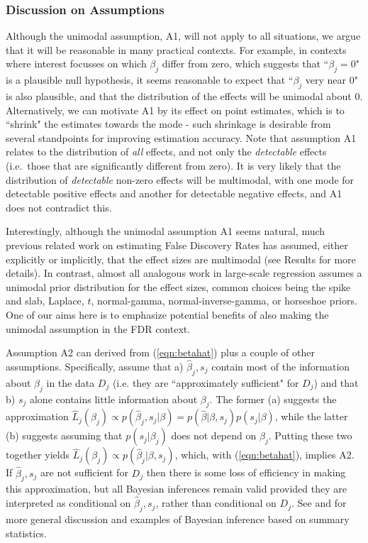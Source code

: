 \documentclass[11pt]{article}
\begin{document}
 \subsubsection*{Discussion on Assumptions}
 
Although the unimodal assumption, A1, will not apply to all situations, we argue that it will be reasonable in many practical contexts. 
For example, in contexts where interest focusses on which $\beta_j$ differ from zero, which suggests that ``$\beta_j=0$" is a plausible null hypothesis,  
it seems reasonable to expect that ``$\beta_j$ very near 0" is also plausible, and that the distribution of the effects will be unimodal about 0. 
Alternatively, we can motivate A1 by its effect on point estimates, which is to ``shrink" the estimates towards the mode - 
such shrinkage is desirable from several standpoints for improving estimation accuracy. 
Note that assumption A1 relates to the distribution of {\it all} effects, and not only the {\it detectable} effects (i.e.~those that are significantly different from zero). It is very likely that the distribution of {\it detectable} non-zero effects will be multimodal, with one mode for detectable positive effects and another for detectable negative effects, and A1 does not contradict this.

Interestingly, although the unimodal assumption A1 seems natural, much previous related work on estimating False Discovery Rates  
has assumed, either explicitly or implicitly, that the effect sizes are multimodal (see Results for more details). 
In contrast, almost all analogous work in large-scale regression assumes
a unimodal prior distribution for the effect sizes, common choices being the spike and slab, Laplace, $t$, normal-gamma, normal-inverse-gamma, or horseshoe priors.
One of our aims here is to emphasize potential benefits of also making the unimodal assumption in the FDR context.

Assumption A2 can derived from (\ref{eqn:betahat}) plus a couple of other assumptions. Specifically, assume that a) $\hat\beta_j, s_j$ contain most of the information about $\beta_j$ in the data $D_j$ (i.e. they are ``approximately sufficient" for $D_j$) and that b) $s_j$ alone contains little information about $\beta_j$. The former (a) suggests the approximation $\hat{L}_j(\beta_j) \propto p(\hat\beta_j, s_j | \beta) = p(\hat\beta | \beta, s_j) p(s_j | \beta)$, while the latter (b) suggests assuming that $p(s_j|\beta_j)$ does not depend on $\beta_j$. Putting these two together yields $\hat{L}_j(\beta_j) \propto p(\hat\beta_j | \beta, s_j)$, which, with (\ref{eqn:betahat}),  implies A2. If $\hat\beta_j, s_j$ are not sufficient for $D_j$ then there is some loss of efficiency in making this approximation, but all Bayesian inferences remain valid provided they are interpreted as conditional on $\hat\beta_j,s_j$, rather than conditional on $D_j$. See \cite{johnson.xx} and \cite{wakefield.xx} for more general discussion and examples of Bayesian inference based on summary statistics. 
\end{document}
